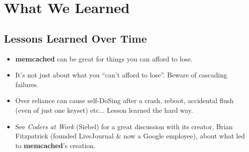 \documentclass{beamer}
\newenvironment{itemizeframe}
               {\begin{frame}\startitemizeframe} 
               {\stopitemizeframe\end{frame}}
\newcommand\startitemizeframe{\begin{itemize}} \newcommand\stopitemizeframe{\end{itemize}}
\begin{document}
\section{What We Learned}
\subsection[Lessons Learned]{Lessons Learned Over Time}

\begin{itemizeframe}
    \frametitle{memcached can rapidly become a crutch\ldots}
    \framesubtitle{meant to make up for RDBMS' shortfalls but often masks other issues\ldots}
	\item {\bf memcached} can be great for things you can afford to lose.
	\item It's not just about what you ``can't afford to lose''. Beware of cascading failures. 
	\item Over reliance can cause self-DoSing after a crash, reboot, accidental flush (even of just one keyset) etc... Lesson learned the hard way.
	\item See {\em Coders at Work} (Siebel) for a great discussion with its creator, Brian Fitzpatrick (founded  LiveJournal \& now a Google employee), about what led to {\bf memcached}'s creation.
\end{itemizeframe}
\end{document}
